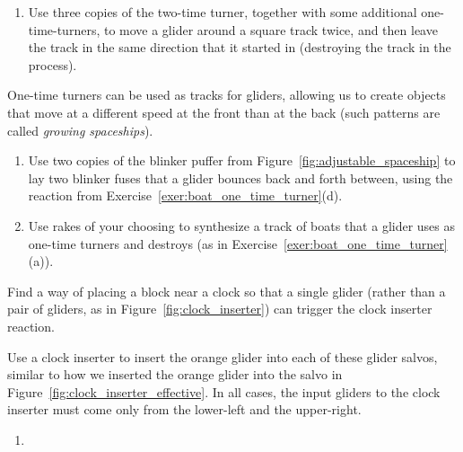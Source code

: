 \begin{multicols}{2}
\begin{problemstar}
\begin{enumerate}[label=\bf\color{ocre}(\alph*)]
		\item Use three copies of the two-time turner, together with some additional one-time-turners, to move a glider around a square track twice, and then leave the track in the same direction that it started in (destroying the track in the process).
	\end{enumerate}
\end{problemstar}


\mfilbreak


\begin{problemstar}\label{exer:one_time_track}
	One-time turners can be used as tracks for gliders, allowing us to create objects that move at a different speed at the front than at the back (such patterns are called \emph{growing spaceships}).
	\begin{enumerate}[label=\bf\color{ocre}(\alph*)]
		\item Use two copies of the blinker puffer from Figure~\ref{fig:adjustable_spaceship} to lay two blinker fuses that a glider bounces back and forth between, using the reaction from Exercise~\ref{exer:boat_one_time_turner}(d).
		
		\item Use rakes of your choosing to synthesize a track of boats that a glider uses as one-time turners and destroys (as in Exercise~\ref{exer:boat_one_time_turner}(a)).
	\end{enumerate}
\end{problemstar}


\mfilbreak


\begin{problemstar}\label{exer:clock_inserter_block}
	Find a way of placing a block near a clock so that a single glider (rather than a pair of gliders, as in Figure~\ref{fig:clock_inserter}) can trigger the clock inserter reaction.
\end{problemstar}


\mfilbreak


\begin{problemstar}\label{exer:clock_inserter_use}
	Use a clock inserter to insert the orange glider into each of these glider salvos, similar to how we inserted the orange glider into the salvo in Figure~\ref{fig:clock_inserter_effective}. In all cases, the input gliders to the clock inserter must come only from the lower-left and the upper-right.
	\vspace*{-0.3cm}\begin{multicols}{2}
		\begin{enumerate}[label=\bf\color{ocre}(\alph*)]
			\item[\bf\color{ocre}(a)] 
			

\end{enumerate}
\end{multicols}
\end{problemstar}
\end{multicols}
